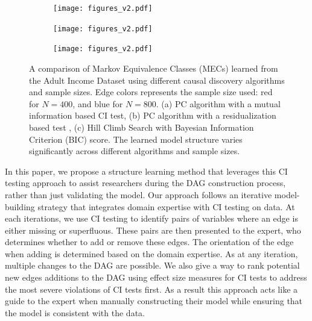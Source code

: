 \documentclass{uai2025} %
\begin{document}

\begin{figure}[t!]
    \begin{subfigure}{0.5 \textwidth}
	\centering
    	\texttt{[image: figures\_v2.pdf]}
    	\caption{}
    \end{subfigure}
    \begin{subfigure}{0.5\textwidth}
	\centering
    	\texttt{[image: figures\_v2.pdf]}
    	\caption{}
    \end{subfigure}
    \begin{subfigure}{0.5\textwidth}
	\centering
    	\texttt{[image: figures\_v2.pdf]}
    	\caption{}
    \end{subfigure}

    \caption{A comparison of Markov Equivalence Classes (MECs) learned from the Adult
	     Income Dataset \citep{Becker1996} using different causal discovery
	     algorithms and sample sizes. Edge colors represents the sample size
	     used: red for $N=400$, and blue for $N=800$. (a) PC algorithm with a
	     mutual information based CI test, (b) PC algorithm with a
    	     residualization based test \citep{Ankan2023}, (c) Hill Climb Search with
	     Bayesian Information Criterion (BIC) score. The learned model structure varies
             significantly across different algorithms and sample sizes.}
    \label{fig:intro}
\end{figure}

In this paper, we propose a structure learning method that leverages this CI
testing approach to assist researchers during the DAG construction process,
rather than just validating the model. Our approach follows an iterative
model-building strategy that integrates domain expertise with CI testing on
data. At each iterations, we use CI testing to identify pairs of variables
where an edge is either missing or superfluous. These pairs are then presented
to the expert, who determines whether to add or remove these edges. The
orientation of the edge when adding is determined based on the domain
expertise. As at any iteration, multiple changes to the DAG are possible. We
also give a way to rank potential new edges additions to the DAG using effect
size measures for CI tests to address the most severe violations of CI tests
first. As a result this approach acts like a guide to the expert when manually
constructing their model while ensuring that the model is consistent with the
data. 
\end{document}
